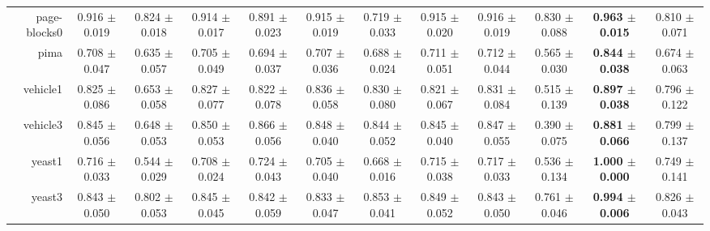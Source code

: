 \begin{table}[!ht]
{\begin{tabular}{r c c c c c c c c c c c}
page-blocks0 & 0.916 $\pm$ 0.019 & 0.824 $\pm$ 0.018 & 0.914 $\pm$ 0.017 & 0.891 $\pm$ 0.023 & 0.915 $\pm$ 0.019 & 0.719 $\pm$ 0.033 & 0.915 $\pm$ 0.020 & 0.916 $\pm$ 0.019 & 0.830 $\pm$ 0.088 & \textbf{0.963 $\pm$ 0.015} & 0.810 $\pm$ 0.071 \\
pima & 0.708 $\pm$ 0.047 & 0.635 $\pm$ 0.057 & 0.705 $\pm$ 0.049 & 0.694 $\pm$ 0.037 & 0.707 $\pm$ 0.036 & 0.688 $\pm$ 0.024 & 0.711 $\pm$ 0.051 & 0.712 $\pm$ 0.044 & 0.565 $\pm$ 0.030 & \textbf{0.844 $\pm$ 0.038} & 0.674 $\pm$ 0.063 \\
vehicle1 & 0.825 $\pm$ 0.086 & 0.653 $\pm$ 0.058 & 0.827 $\pm$ 0.077 & 0.822 $\pm$ 0.078 & 0.836 $\pm$ 0.058 & 0.830 $\pm$ 0.080 & 0.821 $\pm$ 0.067 & 0.831 $\pm$ 0.084 & 0.515 $\pm$ 0.139 & \textbf{0.897 $\pm$ 0.038} & 0.796 $\pm$ 0.122 \\
vehicle3 & 0.845 $\pm$ 0.056 & 0.648 $\pm$ 0.053 & 0.850 $\pm$ 0.053 & 0.866 $\pm$ 0.056 & 0.848 $\pm$ 0.040 & 0.844 $\pm$ 0.052 & 0.845 $\pm$ 0.040 & 0.847 $\pm$ 0.055 & 0.390 $\pm$ 0.075 & \textbf{0.881 $\pm$ 0.066} & 0.799 $\pm$ 0.137 \\
yeast1 & 0.716 $\pm$ 0.033 & 0.544 $\pm$ 0.029 & 0.708 $\pm$ 0.024 & 0.724 $\pm$ 0.043 & 0.705 $\pm$ 0.040 & 0.668 $\pm$ 0.016 & 0.715 $\pm$ 0.038 & 0.717 $\pm$ 0.033 & 0.536 $\pm$ 0.134 & \textbf{1.000 $\pm$ 0.000} & 0.749 $\pm$ 0.141 \\
yeast3 & 0.843 $\pm$ 0.050 & 0.802 $\pm$ 0.053 & 0.845 $\pm$ 0.045 & 0.842 $\pm$ 0.059 & 0.833 $\pm$ 0.047 & 0.853 $\pm$ 0.041 & 0.849 $\pm$ 0.052 & 0.843 $\pm$ 0.050 & 0.761 $\pm$ 0.046 & \textbf{0.994 $\pm$ 0.006} & 0.826 $\pm$ 0.043 \\
\end{tabular}}
\end{table}
